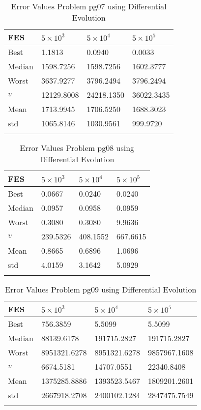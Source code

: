 \documentclass[10pt, a4paper]{book}
\begin{document}
\begin{center}
\begin{longtable}{l l l l}
FES & $5 \times 10^{3}$ & $5 \times 10^{4}$ & $5 \times 10^{5}$ \\
\hline
Best & 1.1813 & 0.0940 & 0.0033 \\
Median & 1598.7256 & 1598.7256 & 1602.3777 \\
Worst & 3637.9277 & 3796.2494 & 3796.2494 \\
$v$ & 12129.8008 & 24218.1350 & 36022.3435 \\
Mean & 1713.9945 & 1706.5250 & 1688.3023 \\
std & 1065.8146 & 1030.9561 & 999.9720 \\
\caption{ Error Values Problem pg07 using Differential Evolution }
\end{longtable}
\end{center}

\begin{center}
\begin{longtable}{l l l l}
FES & $5 \times 10^{3}$ & $5 \times 10^{4}$ & $5 \times 10^{5}$ \\
\hline
Best & 0.0667 & 0.0240 & 0.0240 \\
Median & 0.0957 & 0.0958 & 0.0959 \\
Worst & 0.3080 & 0.3080 & 9.9636 \\
$v$ & 239.5326 & 408.1552 & 667.6615 \\
Mean & 0.8665 & 0.6896 & 1.0696 \\
std & 4.0159 & 3.1642 & 5.0929 \\
\caption{ Error Values Problem pg08 using Differential Evolution }
\end{longtable}
\end{center}

\begin{center}
\begin{longtable}{l l l l}
FES & $5 \times 10^{3}$ & $5 \times 10^{4}$ & $5 \times 10^{5}$ \\
\hline
Best & 756.3859 & 5.5099 & 5.5099 \\
Median & 88139.6178 & 191715.2827 & 191715.2827 \\
Worst & 8951321.6278 & 8951321.6278 & 9857967.1608 \\
$v$ & 6674.5181 & 14707.0551 & 22340.8408 \\
Mean & 1375285.8886 & 1393523.5467 & 1809201.2601 \\
std & 2667918.2708 & 2400102.1284 & 2847475.7549 \\
\caption{ Error Values Problem pg09 using Differential Evolution }
\end{longtable}
\end{center}
\end{document}
